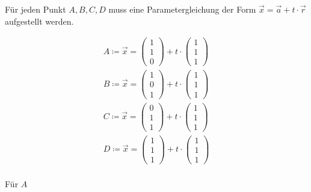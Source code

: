 Für jeden Punkt \ensuremath{A,B,C,D} muss eine Parametergleichung der Form \ensuremath{\vec{x} = \vec{a}+t\cdot \vec{r}} aufgestellt werden.

\begin{gather}
A\coloneqq \vec{x}=\begin{pmatrix}
1\\1\\0
\end{pmatrix} +t\cdot\begin{pmatrix}
1\\1\\1
\end{pmatrix}\\
B\coloneqq \vec{x}=\begin{pmatrix}
1\\0\\1
\end{pmatrix} +t\cdot\begin{pmatrix}
1\\1\\1
\end{pmatrix}\\
C\coloneqq \vec{x}=\begin{pmatrix}
0\\1\\1
\end{pmatrix} +t\cdot\begin{pmatrix}
1\\1\\1
\end{pmatrix}\\
D\coloneqq \vec{x}=\begin{pmatrix}
1\\1\\1
\end{pmatrix} +t\cdot\begin{pmatrix}
1\\1\\1
\end{pmatrix}
\end{gather}\\

 
Für \ensuremath{A}  %
 
